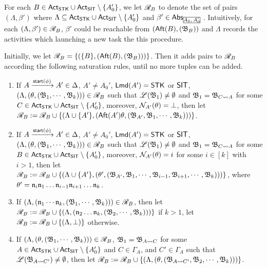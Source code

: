 {For each $B\in{\sf Act}_{\mathsf{STK}}\cup{\sf Act}_{\mathsf{SIT}}\setminus\{A_0'\}$, we let $\mathscr{R}_{B}$ to denote the set of pairs $(\Lambda, \beta')$ where $\Lambda \subseteq {\sf Act}_{\mathsf{STK}}\cup{\sf Act}_{\mathsf{SIT}}\setminus\{A_0'\}$ and $\beta' \in \abs_{\mhcancel{A_0, A_0'}}$. Intuitively, for each $(\Lambda, \beta') \in \mathscr{R}_{B}$, $\beta'$ could be reachable from $({\sf Aft}(B),({\mathfrak{B} }_{B}))$ and $\Lambda$ records the activities which launching a new task the this procedure.

Initially, we let $\mathscr{R}_{B} = \{(\{B\}, ({\sf Aft}(B), ({\mathfrak{B} }_B)))\}$. Then it adds pairs to $\mathscr{R}_{B}$ according the following saturation rules, until no more tuples can be added.

\smallskip
\fbox
{
\begin{minipage}{0.9\textwidth}
\begin{enumerate}
    \item If $A \xrightarrow{{\mathsf{start} }(\phi)}A' \in\Delta$, $A'\neq A_0'$, ${\sf Lmd}(A')=\mathsf{STK}$ or ${\sf SIT}$, $(\Lambda,(\theta, ({\mathfrak{B} }_1,\cdots,{\mathfrak{B} }_k))) \in \mathscr{R}_{B}$ such that ${\mathscr{L} }({\mathfrak{B} }_1) \neq \emptyset$ and ${\mathfrak{B} }_1 = {\mathfrak{B} }_{C\rightsquigarrow A}$ for some $C \in {\sf Act}_{\sf STK}\cup{\sf Act}_{\sf SIT}\setminus\{A_0'\}$, moreover, $\mathcal{N}_{A'}(\theta) = \bot$,
    then let $\mathscr{R}_{B}: = \mathscr{R}_{B} \cup \{(\Lambda\cup\{A'\},({\sf Aft}(A')\theta, ({\mathfrak{B} }_{A'},{\mathfrak{B} }_1,\cdots,{\mathfrak{B} }_k)))\}$.
    \item If $A \xrightarrow{{\mathsf{start} }(\phi)}A' \in\Delta$, $A'\neq A_0'$, ${\sf Lmd}(A')=\mathsf{STK}$ or ${\sf SIT}$, $(\Lambda,(\theta, ({\mathfrak{B} }_1,\cdots,{\mathfrak{B} }_k))) \in \mathscr{R}_{B}$ such that ${\mathscr{L} }({\mathfrak{B} }_1) \neq \emptyset$ and ${\mathfrak{B} }_1 = {\mathfrak{B} }_{C\rightsquigarrow A}$ for some $B \in {\sf Act}_{\sf STK}\cup{\sf Act}_{\sf SIT}\setminus\{A_0'\}$, moreover, $\mathcal{N}_{A'}(\theta) = i$ for some $i \in [k]$ with $i > 1$, 
        then let $\mathscr{R}_{B}:= \mathscr{R}_{B} \cup \{(\Lambda\cup\{A'\},(\theta', ({\mathfrak{B} }_{A'}, {\mathfrak{B} }_1, \cdots,{\mathfrak{B} }_{i-1},{\mathfrak{B} }_{i+1},\cdots,{\mathfrak{B} }_{k})))\}$, where $\theta' = \mathfrak{n}_i\mathfrak{n}_1\dots\mathfrak{n}_{i-1}\mathfrak{n}_{i+1}\dots\mathfrak{n}_k$. 
    \item If $(\Lambda,(\mathfrak{n}_1 \cdots \mathfrak{n}_k, ({\mathfrak{B} }_1,\cdots,{\mathfrak{B} }_k))) \in \mathscr{R}_{B}$, then let $\mathscr{R}_{B} := \mathscr{R}_{B} \cup \{(\Lambda,(\mathfrak{n}_2\dots\mathfrak{n}_k, ({\mathfrak{B} }_2,\cdots,{\mathfrak{B} }_k)))\}$ if $k > 1$, let $\mathscr{R}_{B} := \mathscr{R}_{B} \cup \{(\Lambda,\bot)\}$ otherwise.
%
    \item If $(\Lambda,(\theta, ({\mathfrak{B} }_1,\cdots,{\mathfrak{B} }_k))) \in \mathscr{R}_{B}$, ${\mathfrak{B} }_1 = {\mathfrak{B} }_{A\rightsquigarrow C}$ for some $A\in{\sf Act}_{\mathsf{STK}}\cup{\sf Act}_{\mathsf{SIT}}\setminus\{A_0'\}$ and $C \in \Gamma_A$, and $C'  \in \Gamma_A$ such that ${\mathscr{L} }({\mathfrak{B} }_{A\rightsquigarrow C'}) \neq \emptyset$, then let 
    $\mathscr{R}_{B} := \mathscr{R}_{B} \cup \{(\Lambda,(\theta, ({\mathfrak{B} }_{A\rightsquigarrow C'}, {\mathfrak{B} }_2,\cdots,{\mathfrak{B} }_k)))\}$. 


\end{enumerate}
\end{minipage}}}
